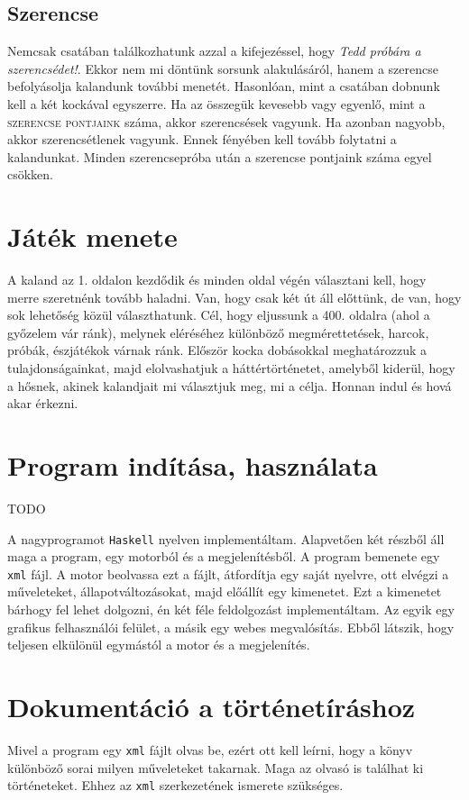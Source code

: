 \documentclass[12pt,a4paper,oneside]{report}
\newcommand{\stat}{\textsc}
\newcommand{\proglang}{\texttt}
\begin{document}
      \subsection{Szerencse}
        Nemcsak csatában találkozhatunk azzal a kifejezéssel, hogy
        \emph{Tedd próbára a szerencsédet!}. Ekkor nem mi döntünk
        sorsunk alakulásáról, hanem a szerencse befolyásolja kalandunk
        további menetét. Hasonlóan, mint a csatában dobnunk kell a két
        kockával egyszerre. Ha az összegük kevesebb vagy egyenlő, mint
        a \stat{szerencse pontjaink} száma, akkor szerencsések
        vagyunk. Ha azonban nagyobb, akkor szerencsétlenek
        vagyunk. Ennek fényében kell tovább folytatni a
        kalandunkat. Minden szerencsepróba után a szerencse pontjaink
        száma egyel csökken.
    
      \section{Játék menete}
        A kaland az 1. oldalon kezdődik és minden oldal végén választani kell,
        hogy merre szeretnénk tovább haladni. Van, hogy csak két út áll
        előttünk, de van, hogy sok lehetőség közül választhatunk. Cél, hogy
        eljussunk a 400. oldalra (ahol a győzelem vár ránk), melynek eléréséhez
        különböző megmérettetések, harcok, próbák, észjátékok várnak ránk.
        Először kocka dobásokkal meghatározzuk a tulajdonságainkat, majd
        elolvashatjuk a háttértörténetet, amelyből kiderül, hogy a hősnek,
        akinek kalandjait mi választjuk meg, mi a célja. Honnan indul és
        hová akar érkezni.
    \section{Program indítása, használata}
      TODO
      
 A nagyprogramot \proglang{Haskell}
nyelven implementáltam. Alapvetően két részből áll maga a program, egy
motorból és a megjelenítésből. A program bemenete egy \proglang{xml}
fájl. A motor beolvassa ezt a fájlt, átfordítja egy saját nyelvre, ott
elvégzi a műveleteket, állapotváltozásokat, majd előállít egy
kimenetet. Ezt a kimenetet bárhogy fel lehet dolgozni, én két féle
feldolgozást implementáltam. Az egyik egy graf{}ikus felhasználói
felület, a másik egy webes megvalósítás. Ebből látszik, hogy teljesen
elkülönül egymástól a motor és a megjelenítés.

  \section{Dokumentáció a történetíráshoz}
    Mivel a program egy \proglang{xml} fájlt olvas be, ezért ott kell
    leírni, hogy a könyv különböző sorai milyen műveleteket
    takarnak. Maga az olvasó is találhat ki történeteket. Ehhez az
    \proglang{xml} szerkezetének ismerete szükséges.
\end{document}
